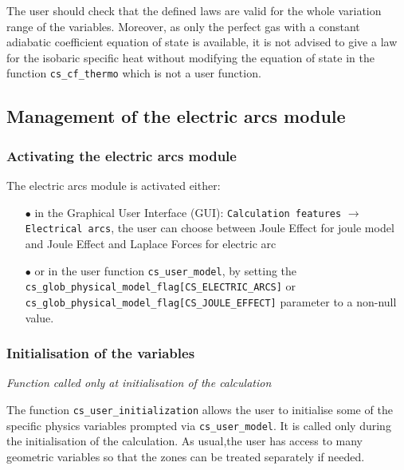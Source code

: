 The user should check that the defined laws are valid for
the whole variation range of the variables. Moreover, as only the perfect gas with a constant
adiabatic coefficient equation of state is available, it is not advised to give a law for the isobaric
specific heat without modifying the equation of state in the function \texttt{cs\_cf\_thermo} which is not
a user function.

\subsection{Management of the electric arcs module}

\subsubsection{Activating the electric arcs module}\label{sec:acti-lag}

The electric arcs module is activated either:
%
\begin{itemize}
 \item [$\bullet$] in the Graphical User Interface (GUI): \texttt{Calculation features} $\rightarrow$ \texttt{Electrical arcs}, the user can choose between Joule Effect for joule model and Joule Effect and Laplace Forces for electric arc


 \item [$\bullet$] or in the user function \texttt{cs\_user\_model}, by setting the \texttt{cs\_glob\_physical\_model\_flag[CS\_ELECTRIC\_ARCS]} or \texttt{cs\_glob\_physical\_model\_flag[CS\_JOULE\_EFFECT]} parameter to a non-null value.
\end{itemize}

\subsubsection{Initialisation of the variables}

\noindent
\textit{Function called only at initialisation of the calculation}

The function \texttt{cs\_user\_initialization} allows the user to initialise some of the specific physics variables prompted via \texttt{cs\_user\_model}. It is called only during the initialisation of the calculation. As usual,the user has access to many geometric variables so
 that the zones can be treated separately if needed.

